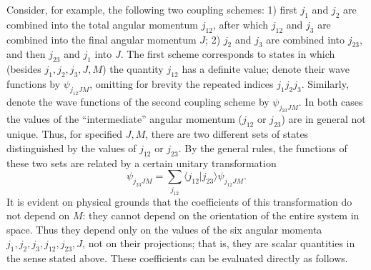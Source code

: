 Consider, for example, the following two coupling schemes: 1) first $j_1$ and $j_2$ are combined into the total angular momentum $j_{12}$, after which $j_{12}$ and $j_3$ are combined into the final angular momentum $J$; 2) $j_2$ and $j_3$ are combined into $j_{23}$, and then $j_{23}$ and $j_1$ into $J$. The first scheme corresponds to states in which (besides $j_1,j_2,j_3,J,M$) the quantity $j_{12}$ has a definite value; denote their wave functions by $\psi_{j_{12}JM}$, omitting for brevity the repeated indices $j_1j_2j_3$. Similarly, denote the wave functions of the second coupling scheme by $\psi_{j_{23}JM}$. In both cases the values of the ``intermediate'' angular momentum ($j_{12}$ or $j_{23}$) are in general not unique. Thus, for specified $J,M$, there are two different sets of states distinguished by the values of $j_{12}$ or $j_{23}$. By the general rules, the functions of these two sets are related by a certain unitary transformation
\begin{equation}
 \psi_{j_{23}JM}=\sum_{j_{12}}\langle j_{12}|j_{23}\rangle\psi_{j_{12}JM}.
 \tag{108.5}
\end{equation}
It is evident on physical grounds that the coefficients of this transformation do not depend on $M$: they cannot depend on the orientation of the entire system in space. Thus they depend only on the values of the six angular momenta $j_1,j_2,j_3,j_{12},j_{23},J$, not on their projections; that is, they are scalar quantities in the sense stated above. These coefficients can be evaluated directly as follows.

